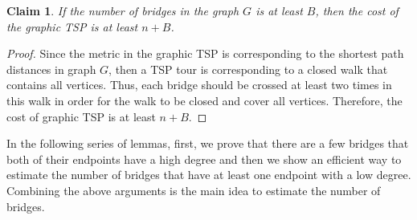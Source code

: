 \documentclass[letterpaper,11pt]{article}
\newtheorem{claim}[theorem]{Claim}
\newenvironment{myproof}{
\vspace{-0.5cm}
\begin{proof}
}{
\end{proof}
}
\begin{document}
\begin{claim}\label{lem:brdige-lower-bound}
If the number of bridges in the graph $G$ is at least $B$, then the cost of the graphic TSP is at least $n + B$.
\end{claim}
\begin{myproof}
Since the metric in the graphic TSP is corresponding to the shortest path distances in graph $G$, then a TSP tour is corresponding to a closed walk that contains all vertices. Thus, each bridge should be crossed at least two times in this walk in order for the walk to be closed and cover all vertices. Therefore, the cost of graphic TSP is at least $n + B$.
\end{myproof}


In the following series of lemmas, first, we prove that there are a few bridges that both of their endpoints have a high degree and then we show an efficient way to estimate the number of bridges that have at least one endpoint with a low degree. Combining the above arguments is the main idea to estimate the number of bridges.
\end{document}

